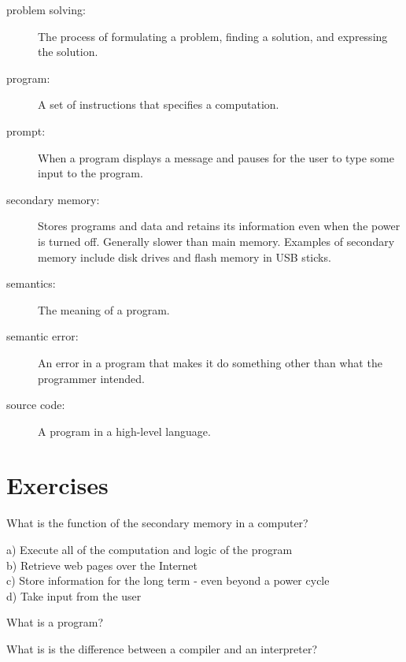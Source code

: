 \documentclass[11pt]{book}
\begin{document}
\begin{description}
\item[problem solving:]  The process of formulating a problem, finding
a solution, and expressing the solution.

\item[program:] A set of instructions that specifies a computation.

\item[prompt:] When a program displays a message and pauses for the 
user to type some input to the program.

\item[secondary memory:] Stores programs and data and retains its 
information even when the power is turned off.  Generally slower 
than main memory.  Examples of secondary memory include disk 
drives and flash memory in USB sticks.

\item[semantics:]  The meaning of a program.

\item[semantic error:]   An error in a program that makes it do something
other than what the programmer intended.

\item[source code:]  A program in a high-level language.

\end{description}

\section{Exercises}


\begin{ex}
What is the function of the secondary memory in a computer?

a) Execute all of the computation and logic of the program\\
b) Retrieve web pages over the Internet\\
c) Store information for the long term - even beyond a power cycle\\
d) Take input from the user 
\end{ex}

\begin{ex}
What is a program?
\end{ex}

\begin{ex}
What is is the difference between a compiler and an interpreter?
\end{ex}
\end{document}
